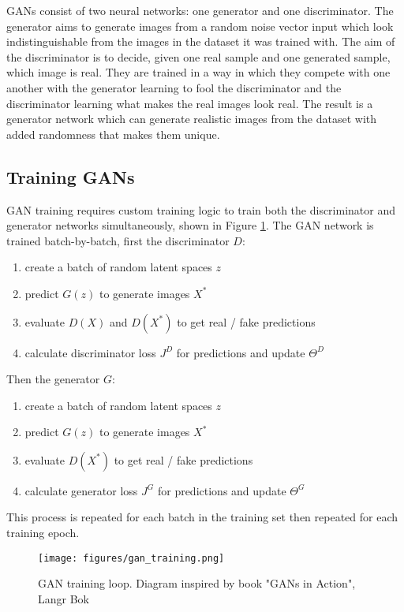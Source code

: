 \documentclass[
    author={Kai Hulme},
    supervisor={Dr Jon Bird},
    degree={BSc},
    title={Generative Adversarial Networks as an Augmentation Technique},
    subtitle={for Alzheimer's Disease Detection in MRI Volumes},
    type={Research},
    year={2021} 
]{dissertation}
\begin{document}
GANs consist of two neural networks: one generator and one discriminator. The generator aims to generate images from a random noise vector input which look indistinguishable from the images in the dataset it was trained with. The aim of the discriminator is to decide, given one real sample and one generated sample, which image is real. They are trained in a way in which they compete with one another with the generator learning to fool the discriminator and the discriminator learning what makes the real images look real. The result is a generator network which can generate realistic images from the dataset with added randomness that makes them unique.

\subsection{Training GANs}

GAN training requires custom training logic to train both the discriminator and generator networks simultaneously, shown in Figure \ref{gantrainloopdiag}. The GAN network is trained batch-by-batch, first the discriminator $D$:

\begin{enumerate}
    \item create a batch of random latent spaces $z$
    \item predict $G(z)$ to generate images $X^*$
    \item evaluate $D(X)$ and $D(X^*)$ to get real / fake predictions
    \item calculate discriminator loss $J^D$ for predictions and update $\Theta^D$
\end{enumerate}
    
Then the generator $G$:

\begin{enumerate}
    \item create a batch of random latent spaces $z$
    \item predict $G(z)$ to generate images $X^*$
    \item evaluate $D(X^*)$ to get real / fake predictions
    \item calculate generator loss $J^G$ for predictions and update $\Theta^G$
\end{enumerate}    

This process is repeated for each batch in the training set then repeated for each training epoch.

\begin{figure}[t]
    \label{gantrainloopdiag}
    \centering
    \texttt{[image: figures/gan\_training.png]}
    \caption{GAN training loop. Diagram inspired by book "GANs in Action", Langr Bok}
\end{figure}
\end{document}
